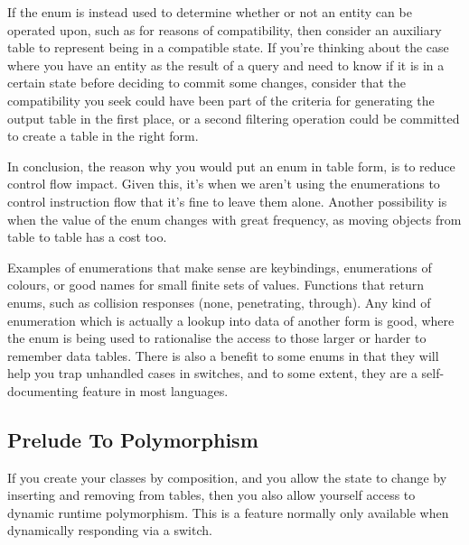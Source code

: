 \documentclass[a4paper,12pt]{book}
\begin{document}
If the enum is instead used to determine whether or not an entity can be operated upon, such as for reasons of compatibility, then consider an auxiliary table to represent being in a compatible state.
If you're thinking about the case where you have an entity as the result of a query and need to know if it is in a certain state before deciding to commit some changes, consider that the compatibility you seek could have been part of the criteria for generating the output table in the first place, or a second filtering operation could be committed to create a table in the right form.

In conclusion, the reason why you would put an enum in table form, is to reduce control flow impact.
Given this, it's when we aren't using the enumerations to control instruction flow that it's fine to leave them alone.
Another possibility is when the value of the enum changes with great frequency, as moving objects from table to table has a cost too.

Examples of enumerations that make sense are keybindings, enumerations of colours, or good names for small finite sets of values.
Functions that return enums, such as collision responses (none, penetrating, through).
Any kind of enumeration which is actually a lookup into data of another form is good, where the enum is being used to rationalise the access to those larger or harder to remember data tables.
There is also a benefit to some enums in that they will help you trap unhandled cases in switches, and to some extent, they are a self-documenting feature in most languages.

\subsection{Prelude To Polymorphism}

If you create your classes by composition, and you allow the state to change by inserting and removing from tables, then you also allow yourself access to dynamic runtime polymorphism.
This is a feature normally only available when dynamically responding via a switch.
\end{document}
